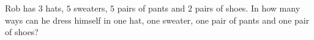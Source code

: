 Rob has $3$ hats, $5$ sweaters, $5$ pairs of pants and $2$ pairs of shoes. In how many ways can he dress himself in one hat, one sweater, one pair of pants and one pair of shoes?
